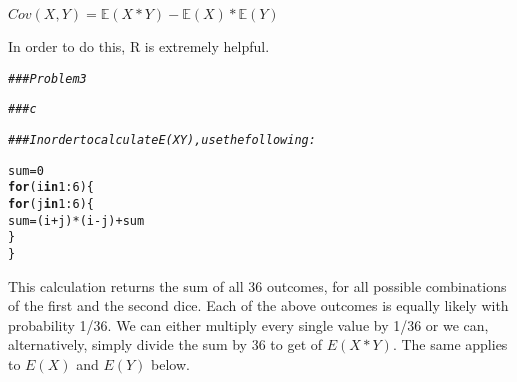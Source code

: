 \documentclass[12pt,letter]{article}\usepackage[]{graphicx}\usepackage[]{color}
\makeatletter
\newcommand{\hlnum}[1]{\textcolor[rgb]{0.686,0.059,0.569}{#1}}%
\newcommand{\hlcom}[1]{\textcolor[rgb]{0.678,0.584,0.686}{\textit{#1}}}%
\newcommand{\hlopt}[1]{\textcolor[rgb]{0,0,0}{#1}}%
\newcommand{\hlstd}[1]{\textcolor[rgb]{0.345,0.345,0.345}{#1}}%
\newcommand{\hlkwa}[1]{\textcolor[rgb]{0.161,0.373,0.58}{\textbf{#1}}}%
\newcommand{\hlkwb}[1]{\textcolor[rgb]{0.69,0.353,0.396}{#1}}%
\newenvironment{kframe}{%
 \def\at@end@of@kframe{}%
 \ifinner\ifhmode%
  \def\at@end@of@kframe{\end{minipage}}%
  \begin{minipage}{\columnwidth}%
 \fi\fi%
 \def\FrameCommand##1{\hskip\@totalleftmargin \hskip-\fboxsep
 \colorbox{shadecolor}{##1}\hskip-\fboxsep
     \hskip-\linewidth \hskip-\@totalleftmargin \hskip\columnwidth}%
 \MakeFramed {\advance\hsize-\width
   \@totalleftmargin\z@ \linewidth\hsize
   \@setminipage}}%
 {\par\unskip\endMakeFramed%
 \at@end@of@kframe}
\newenvironment{knitrout}{}{} %
\makeatother
\begin{document}
$Cov(X, Y) = \mathbb{E}(X*Y)-\mathbb{E}(X)*\mathbb{E}(Y)$

In order to do this, R is extremely helpful.

\begin{knitrout}
\color{fgcolor}\begin{kframe}
\begin{alltt}
\hlcom{### Problem 3}

\hlcom{### c}

\hlcom{### In order to calculate E(XY), use the following:}

\hlstd{sum} \hlkwb{=} \hlnum{0}
\hlkwa{for} \hlstd{(i} \hlkwa{in} \hlnum{1}\hlopt{:}\hlnum{6}\hlstd{) \{}
    \hlkwa{for} \hlstd{(j} \hlkwa{in} \hlnum{1}\hlopt{:}\hlnum{6}\hlstd{) \{}
        \hlstd{sum} \hlkwb{=} \hlstd{(i} \hlopt{+} \hlstd{j)} \hlopt{*} \hlstd{(i} \hlopt{-} \hlstd{j)} \hlopt{+} \hlstd{sum}
    \hlstd{\}}
\hlstd{\}}
\end{alltt}
\end{kframe}
\end{knitrout}

This calculation returns the sum of all 36 outcomes, for all possible combinations of the first and the second dice. Each of the above outcomes is equally likely with probability 1/36. We can either multiply every single value by 1/36 or we can, alternatively, simply divide the sum by 36 to get of $E(X*Y)$. The same applies to $E(X)$ and $E(Y)$ below.
\end{document}
